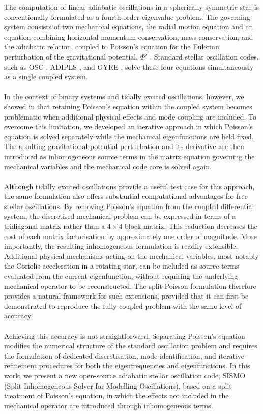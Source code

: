 \documentclass[]{aa}
\begin{document}
The computation of linear adiabatic oscillations in a spherically symmetric star is conventionally formulated as a fourth-order eigenvalue problem. The governing system consists of two mechanical equations, the radial motion equation and an equation combining horizontal momentum conservation, mass conservation, and the adiabatic relation, coupled to Poisson's equation for the Eulerian perturbation of the gravitational potential, $\Phi'$ \citep[e.g.][]{unno1989}. Standard stellar oscillation codes, such as OSC \citep{scuflaire2008}, ADIPLS \citep{jcd2008}, and GYRE \citep{townsend2013}, solve these four equations simultaneously as a single coupled system.
\\~\\In the context of binary systems and tidally excited oscillations, however, we showed in \citet{Fellay2025,Fellay2026} that retaining Poisson's equation within the coupled system becomes problematic when additional physical effects and mode coupling are included. To overcome this limitation, we developed an iterative approach in which Poisson's equation is solved separately while the mechanical eigenfunctions are held fixed. The resulting gravitational-potential perturbation and its derivative are then introduced as inhomogeneous source terms in the matrix equation governing the mechanical variables and the mechanical code core is solved again.
\\~\\Although tidally excited oscillations provide a useful test case for this approach, the same formulation also offers substantial computational advantages for free stellar oscillations. By removing Poisson's equation from the coupled differential system, the discretised mechanical problem can be expressed in terms of a tridiagonal matrix rather than a $4\times4$ block matrix. This reduction decreases the cost of each matrix factorisation by approximately one order of magnitude. More importantly, the resulting inhomogeneous formulation is readily extensible. Additional physical mechanisms acting on the mechanical variables, most notably the Coriolis acceleration in a rotating star, can be included as source terms evaluated from the current eigenfunction, without requiring the underlying mechanical operator to be reconstructed. The split-Poisson formulation therefore provides a natural framework for such extensions, provided that it can first be demonstrated to reproduce the fully coupled problem with the same level of accuracy.
\\~\\Achieving this accuracy is not straightforward. Separating Poisson's equation modifies the numerical structure of the standard oscillation problem and requires the formulation of dedicated discretisation, mode-identification, and iterative-refinement procedures for both the eigenfrequencies and eigenfunctions. In this work, we present a new open-source adiabatic stellar oscillation code, SISMO (Split Inhomogeneous Solver for Modelling Oscillations), based on a split treatment of Poisson's equation, in which the effects not included in the mechanical operator are introduced through inhomogeneous terms. 
\end{document}
